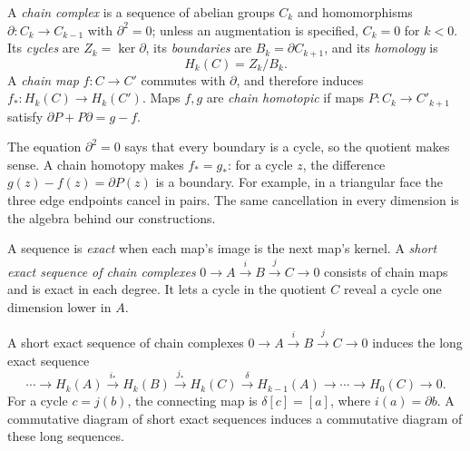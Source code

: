 \begin{definition}
A \emph{chain complex} is a sequence of abelian groups $C_k$ and homomorphisms $\partial:C_k\to C_{k-1}$ with $\partial^2=0$; unless an augmentation is specified, $C_k=0$ for $k<0$. Its \emph{cycles} are $Z_k=\ker\partial$, its \emph{boundaries} are $B_k=\partial C_{k+1}$, and its \emph{homology} is
\[
H_k(C)=Z_k/B_k.
\]
A \emph{chain map} $f:C\to C'$ commutes with $\partial$, and therefore induces $f_*:H_k(C)\to H_k(C')$. Maps $f,g$ are \emph{chain homotopic} if maps $P:C_k\to C'_{k+1}$ satisfy $\partial P+P\partial=g-f$.
\end{definition}

The equation $\partial^2=0$ says that every boundary is a cycle, so the quotient makes sense. A chain homotopy makes $f_*=g_*$: for a cycle $z$, the difference $g(z)-f(z)=\partial P(z)$ is a boundary. For example, in a triangular face the three edge endpoints cancel in pairs. The same cancellation in every dimension is the algebra behind our constructions.

A sequence is \emph{exact} when each map's image is the next map's kernel. A \emph{short exact sequence of chain complexes}
$0\to A\xrightarrow{i}B\xrightarrow{j}C\to0$ consists of chain maps and is exact in each degree. It lets a cycle in the quotient $C$ reveal a cycle one dimension lower in $A$.

\begin{lemma}\label{lem:zigzag}
A short exact sequence of chain complexes $0\to A\xrightarrow{i}B\xrightarrow{j}C\to0$ induces the long exact sequence
\[
\cdots\to H_k(A)\xrightarrow{i_*}H_k(B)\xrightarrow{j_*}H_k(C)
\xrightarrow{\delta}H_{k-1}(A)\to\cdots\to H_0(C)\to0.
\]
For a cycle $c=j(b)$, the connecting map is $\delta[c]=[a]$, where $i(a)=\partial b$. A commutative diagram of short exact sequences induces a commutative diagram of these long sequences.
\end{lemma}

